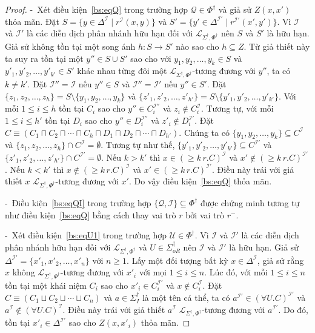 \documentclass[12pt,a4paper,twoside]{report}
\newcommand{\mL}		{\mathcal{L}}
\newcommand{\mI}		{\mathcal{I}}
\newcommand{\mQ}		{\mathcal{Q}}
\newcommand{\mU}		{\mathcal{U}}
\newcommand{\SigmaDagI}	{\Sigma^\dag_I}
\newcommand{\SigmaDagOR}{\Sigma^\dag_{oR}}
\newcommand{\PhiDag}	{\Phi^\dag}
\newcommand{\mLSPD}		{\mL_{\Sigma^\dag,\Phi^\dag}}
\newcommand{\semiItem}	{\mbox{- }}
\newcommand{\mand}		{\sqcap}
\newcommand{\mor}		{\sqcup}
\newcommand{\V}			{\forall}
\theoremstyle{definition}
\begin{document}
\begin{proof}
\semiItem Xét điều kiện~\eqref{bs:eqQ} trong trường hợp $\mQ \in \PhiDag$ và giả sử $Z(x,x')$ thỏa mãn. Đặt $S = \{y \in \Delta^\mI \mid r^\mI(x,y)\}$ và $S' = \{y' \in \Delta^{\mI'} \mid r^{\mI'}(x',y')\}$. Vì $\mI$ và $\mI'$ là các diễn dịch phân nhánh hữu hạn đối với $\mLSPD$ nên $S$ và $S'$ là hữu hạn. 
Giả sử không tồn tại một song ánh $h : S \rightarrow S'$ nào sao cho $h \subseteq Z$. Từ giả thiết này ta suy ra tồn tại một $y'' \in S \cup S'$ sao cho với $y_1, y_2, \ldots, y_k \in S$ và $y'_1, y'_2, \ldots, y'_{k'} \in S'$ khác nhau từng đôi một $\mLSPD$-tương đương với $y''$, ta có $k \not= k'$. Đặt $\mI'' = \mI$ nếu $y'' \in S$ và $\mI'' = \mI'$ nếu $y'' \in S'$. Đặt $\{z_1, z_2, \ldots, z_h\} = S \setminus \{y_1, y_2, \ldots, y_k\}$ và $\{z'_1, z'_2, \ldots, z'_{h'}\} = S \setminus \{y'_1, y'_2, \ldots, y'_{k'}\}$. Với mỗi $1 \leq i \leq h$ tồn tại $C_i$ sao cho $y'' \in C_i^{\mI''}$ và $z_i \notin C_i^{\mI}$. Tương tự, với mỗi $1 \leq i \leq h'$ tồn tại $D_i$ sao cho $y'' \in D_i^{\mI''}$ và $z'_i \notin D_i^{\mI'}$. Đặt $C \equiv (C_1 \mand C_2 \mand \cdots \mand C_h \mand D_1 \mand D_2 \mand \cdots \mand D_{h'})$. Chúng ta có $\{y_1, y_2, \ldots, y_k\} \subseteq C^\mI$ và $\{z_1, z_2, \ldots, z_h\} \cap C^\mI = \emptyset$. Tương tự như thế, $\{y'_1, y'_2, \ldots, y'_{k'}\} \subseteq C^{\mI'}$ và $\{z'_1, z'_2, \ldots, z'_{h'}\} \cap C^{\mI'} = \emptyset$. Nếu $k > k'$ thì $x \in (\geq k\,r.C)^\mI$ và $x' \notin (\geq k\,r.C)^{\mI'}$. Nếu $k < k'$ thì $x \notin (\geq k\,r.C)^\mI$ và $x' \in (\geq k\,r.C)^{\mI'}$. Điều này trái với giả thiết $x$ $\mLSPD$-tương đương với $x'$. Do vậy điều kiện~\eqref{bs:eqQ} thỏa mãn.

\semiItem Điều kiện~\eqref{bs:eqQI} trong trường hợp $\{\mQ,\mI\} \subseteq \PhiDag$ được chứng minh tương tự như điều kiện~\eqref{bs:eqQ} bằng cách thay vai trò $r$ bởi vai trò $r^-$.

\semiItem Xét điều kiện~\eqref{bs:eqU1} trong trường hợp $\mU \in \PhiDag$. Vì $\mI$ và $\mI'$ là các diễn dịch phân nhánh hữu hạn đối với $\mLSPD$ và $U \in \SigmaDagOR$ nên $\mI$ và $\mI'$ là hữu hạn. Giả sử $\Delta^{\mI'} = \{x'_1, x'_2, \ldots, x'_n\}$ với $n \geq 1$. Lấy một đối tượng bất kỳ $x \in \Delta^\mI$, giả sử rằng $x$ không $\mLSPD$-tương đương với $x'_i$ với mọi $1 \leq i \leq n$. Lúc đó, với mỗi $1 \leq i \leq n$ tồn tại một khái niệm $C_i$ sao cho $x'_i \in C_i^{\mI'}$ và $x \notin C_i^{\mI}$. Đặt $C \equiv (C_1 \mor C_2 \mor \cdots \mor C_n)$ và $a \in \SigmaDagI$ là một tên cá thể, ta có $a^{\mI'} \in (\V U.C)^{\mI'}$ và $a^{\mI} \notin (\V U.C)^{\mI}$. Điều này trái với giả thiết $a^\mI$ $\mLSPD$-tương đương với $a^{\mI'}$. Do đó, tồn tại $x'_i \in \Delta^{\mI'}$ sao cho $Z(x, x'_i)$ thỏa mãn.


\end{proof}
\end{document}

